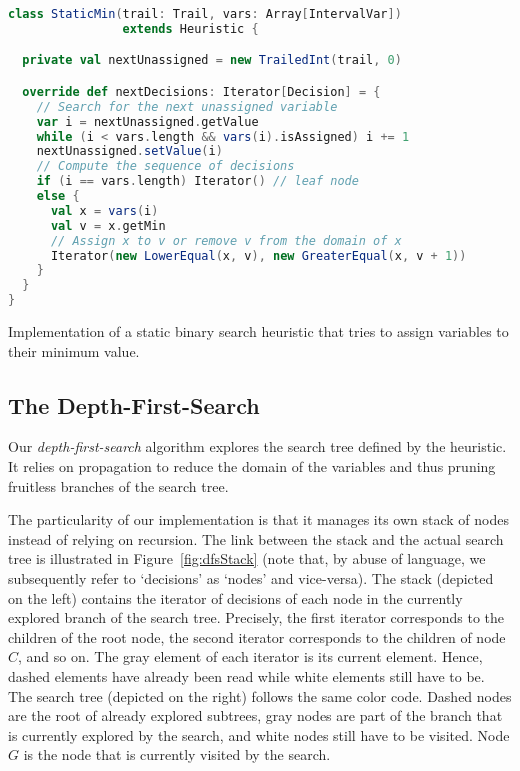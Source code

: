 \documentclass{llncs}
\newcommand{\fig}[1]{Figure~\ref{fig:#1}}
\begin{document}
\begin{code}
\begin{lstlisting}[language=scala, style=lineNumber]
class StaticMin(trail: Trail, vars: Array[IntervalVar]) 
                extends Heuristic {

  private val nextUnassigned = new TrailedInt(trail, 0)

  override def nextDecisions: Iterator[Decision] = {
    // Search for the next unassigned variable
    var i = nextUnassigned.getValue
    while (i < vars.length && vars(i).isAssigned) i += 1
    nextUnassigned.setValue(i)
    // Compute the sequence of decisions
    if (i == vars.length) Iterator() // leaf node
    else {
      val x = vars(i)
      val v = x.getMin
      // Assign x to v or remove v from the domain of x
      Iterator(new LowerEqual(x, v), new GreaterEqual(x, v + 1))
    }
  }
}
\end{lstlisting}
\caption{Implementation of a static binary search heuristic that tries to assign variables to their minimum value.}
\label{code:staticMin}
\end{code}

\subsection{The Depth-First-Search}
\label{sec:dfs}

Our \emph{depth-first-search} algorithm explores the search tree defined by the heuristic. 
It relies on propagation to reduce the domain of the variables and thus pruning fruitless branches of the search tree. 

The particularity of our implementation is that it manages its own stack of nodes instead of relying on recursion. 
%
The link between the stack and the actual search tree is illustrated in \fig{dfsStack} (note that, by abuse of language, we subsequently refer to `decisions' as `nodes' and vice-versa).
%
The stack (depicted on the left) contains the iterator of decisions of each node in the currently explored branch of the search tree. 
%
Precisely, the first iterator corresponds to the children of the root node, the second iterator corresponds to the children of node $C$, and so on. 
%
The gray element of each iterator is its current element. Hence, dashed elements have already been read while white elements still have to be. 
The search tree (depicted on the right) follows the same color code. 
Dashed nodes are the root of already explored subtrees, gray nodes are part of the branch that is currently explored by the search, and white nodes still have to be visited. 
Node $G$ is the node that is currently visited by the search. 
\end{document}
